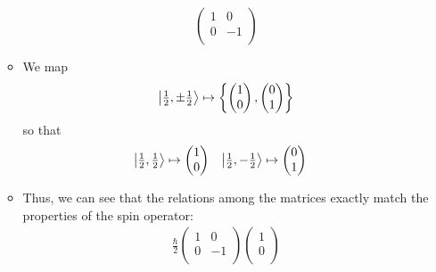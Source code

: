 \documentclass[../notes.tex]{subfiles}
\begin{document}
\begin{itemize}
\begin{itemize}
\begin{equation*}
\begin{pmatrix}
                1 & 0\\
                0 & -1\\
            \end{pmatrix}
        \end{equation*}
        \item We map
        \begin{equation*}
            \ket{\tfrac{1}{2},\pm\tfrac{1}{2}} \mapsto
            \left\{
                \begin{pmatrix}
                    1\\
                    0\\
                \end{pmatrix},
                \begin{pmatrix}
                    0\\
                    1\\
                \end{pmatrix}
            \right\}
        \end{equation*}
        so that
        \begin{align*}
            \ket{\tfrac{1}{2},\tfrac{1}{2}} &\mapsto
            \begin{pmatrix}
                1\\
                0\\
            \end{pmatrix}&
            \ket{\tfrac{1}{2},-\tfrac{1}{2}} &\mapsto
            \begin{pmatrix}
                0\\
                1\\
            \end{pmatrix}
        \end{align*}
        \item Thus, we can see that the relations among the matrices exactly match the properties of the spin operator:
        \begin{align*}
            \frac{\hbar}{2}
            \begin{pmatrix}
                1 & 0\\
                0 & -1\\
            \end{pmatrix}
            \begin{pmatrix}
                1\\
                0\\
            \end{pmatrix}

\end{align*}
\end{itemize}
\end{itemize}
\end{document}
